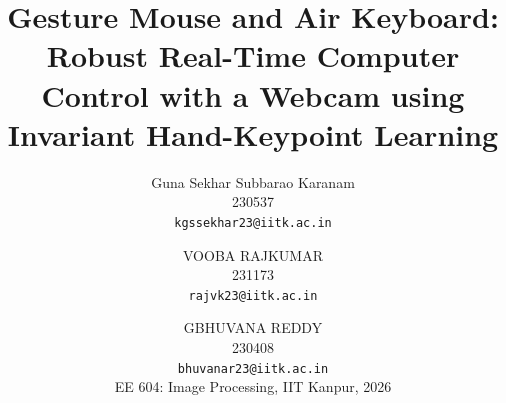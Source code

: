 \title{Gesture Mouse and Air Keyboard: Robust Real-Time Computer Control with a Webcam using Invariant Hand-Keypoint Learning}
\author{Guna Sekhar Subbarao Karanam\\230537\\{\tt\small kgssekhar23@iitk.ac.in} \and VOOBA RAJKUMAR\\231173\\{\tt\small rajvk23@iitk.ac.in} \and GBHUVANA REDDY\\230408\\{\tt\small bhuvanar23@iitk.ac.in}\\[4pt] \small EE 604: Image Processing, IIT Kanpur, 2026}
